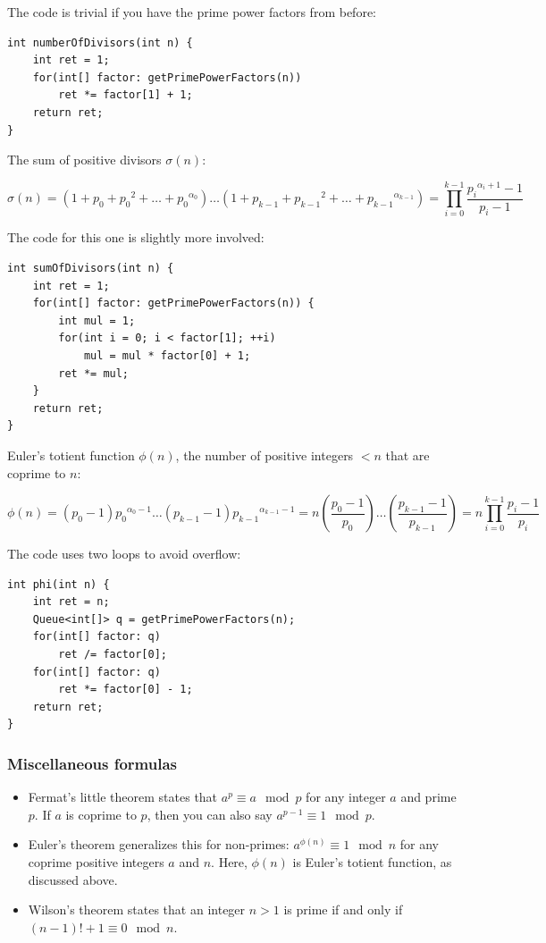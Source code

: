 \documentclass[a4paper,12pt]{article}
\begin{document}
\noindent The code is trivial if you have the prime power factors from before:

\begin{lstlisting}
int numberOfDivisors(int n) {
	int ret = 1;
	for(int[] factor: getPrimePowerFactors(n))
		ret *= factor[1] + 1;
	return ret;
}
\end{lstlisting}

\noindent The sum of positive divisors $\sigma(n)$:

\[\sigma(n) = (1 + p_0 + {p_0}^2 + \ldots + {p_0}^{\alpha_0})\ldots(1 + p_{k-1} + {p_{k-1}}^2 + \ldots + {p_{k-1}}^{\alpha_{k-1}}) = \prod_{i=0}^{k-1}{\frac{{p_i}^{\alpha_i+1} - 1}{p_i - 1}} \]

\noindent The code for this one is slightly more involved:

\begin{lstlisting}
int sumOfDivisors(int n) {
	int ret = 1;
	for(int[] factor: getPrimePowerFactors(n)) {
		int mul = 1;
		for(int i = 0; i < factor[1]; ++i)
			mul = mul * factor[0] + 1;
		ret *= mul;
	}
	return ret;
}
\end{lstlisting}

\noindent Euler's totient function $\phi(n)$, the number of positive integers $<n$ that are coprime to $n$:

\[\phi(n) = (p_0 - 1){p_0}^{\alpha_0-1}\ldots(p_{k-1} - 1){p_{k-1}}^{\alpha_{k-1}-1} = n\left(\frac{p_0-1}{p_0}\right)\ldots\left(\frac{p_{k-1}-1}{p_{k-1}}\right) = n\prod_{i=0}^{k-1}{\frac{p_i - 1}{p_i}} \]

\noindent The code uses two loops to avoid overflow:

\begin{lstlisting}
int phi(int n) {
	int ret = n;
	Queue<int[]> q = getPrimePowerFactors(n);
	for(int[] factor: q)
		ret /= factor[0];
	for(int[] factor: q)
		ret *= factor[0] - 1;
	return ret;
}
\end{lstlisting}

\subsubsection{Miscellaneous formulas}
\begin{itemize}
\item Fermat's little theorem states that $a^p \equiv a \mod{p}$ for any integer $a$ and prime $p$. If $a$ is coprime to $p$, then you can also say $a^{p-1} \equiv 1 \mod{p}$.
\item Euler's theorem generalizes this for non-primes: $a^{\phi(n)} \equiv 1 \mod{n}$ for any coprime positive integers $a$ and $n$. Here, $\phi(n)$ is Euler's totient function, as discussed above.
\item Wilson's theorem states that an integer $n>1$ is prime if and only if $(n-1)!+1 \equiv 0 \mod{n}$.
\end{itemize}
\end{document}
